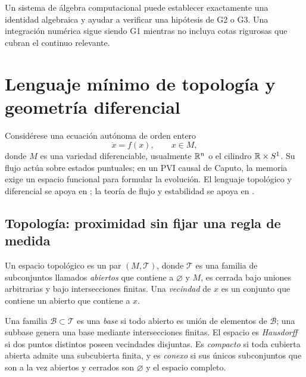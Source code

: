 Un sistema de álgebra computacional puede establecer exactamente una identidad
algebraica y ayudar a verificar una hipótesis de G2 o G3. Una integración
numérica sigue siendo G1 mientras no incluya cotas rigurosas que cubran el
continuo relevante.

\HAFOStudyNeedspace
\section{Lenguaje mínimo de topología y geometría diferencial}
\label{sec:geo-lenguaje}

\HAFOCardTopology

Considérese una ecuación autónoma de orden entero
\begin{equation}
  \dot x=f(x),\qquad x\in M,
  \label{geo:eq:edo-manifold}
\end{equation}
donde \(M\) es una variedad diferenciable, usualmente \(\mathbb{R}^n\) o el cilindro
\(\mathbb{R}\times S^1\). Su flujo actúa sobre estados puntuales; en un PVI causal
de Caputo, la memoria exige un espacio funcional para formular la evolución.
El lenguaje topológico y diferencial se apoya en
\cite{NahmadAchar2022Topologia}; la teoría de flujo y estabilidad se apoya en
\cite{JaurezEtAl2021TGEDI,JaurezEtAl2021TGEDII,HirschSmaleDevaney2013}.

\subsection{Topología: proximidad sin fijar una regla de medida}

\begin{definition}
Un espacio topológico es un par \((M,\mathcal T)\), donde \(\mathcal T\) es una
familia de subconjuntos llamados \emph{abiertos} que contiene a
\(\varnothing\) y \(M\), es cerrada bajo uniones arbitrarias y bajo
intersecciones finitas. Una \emph{vecindad} de \(x\) es un conjunto que
contiene un abierto que contiene a \(x\).
\end{definition}

\begin{definition}
Una familia \(\mathcal B\subset\mathcal T\) es una \emph{base} si todo abierto
es unión de elementos de \(\mathcal B\); una subbase genera una base mediante
intersecciones finitas. El espacio es \emph{Hausdorff} si dos puntos distintos
poseen vecindades disjuntas. Es \emph{compacto} si toda cubierta abierta admite
una subcubierta finita, y es \emph{conexo} si sus únicos subconjuntos que son a
la vez abiertos y cerrados son \(\varnothing\) y el espacio completo.
\end{definition}

